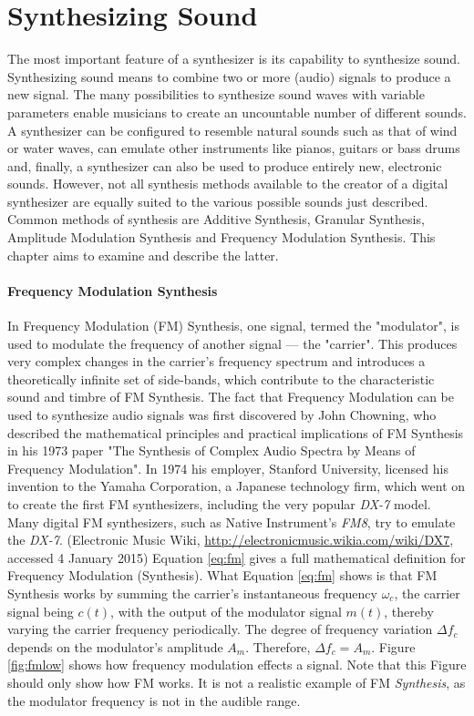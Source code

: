 \chapter{Synthesizing Sound}

The most important feature of a synthesizer is its capability to synthesize sound. Synthesizing sound means to combine two or more (audio) signals to produce a new signal. The many possibilities to synthesize sound waves with variable parameters enable musicians to create an uncountable number of different sounds. A synthesizer can be configured to resemble natural sounds such as that of wind or water waves, can emulate other instruments like pianos, guitars or bass drums and, finally, a synthesizer can also be used to produce entirely new, electronic sounds. However, not all synthesis methods available to the creator of a digital synthesizer are equally suited to the various possible sounds just described. Common methods of synthesis are Additive Synthesis, Granular Synthesis, Amplitude Modulation Synthesis and Frequency Modulation Synthesis. This chapter aims to examine and describe the latter.

\subsubsection{Frequency Modulation Synthesis}

In Frequency Modulation (FM) Synthesis, one signal, termed the "modulator", is used to modulate the frequency of another signal --- the "carrier". This produces very complex changes in the carrier's frequency spectrum and introduces a theoretically infinite set of side-bands, which contribute to the characteristic sound and timbre of FM Synthesis. The fact that Frequency Modulation can be used to synthesize audio signals was first discovered by John Chowning, who described the mathematical principles and practical implications of FM Synthesis in his 1973 paper "The Synthesis of Complex Audio Spectra by Means of Frequency Modulation". In 1974 his employer, Stanford University, licensed his invention to the Yamaha Corporation, a Japanese technology firm, which went on to create the first FM synthesizers, including the very popular \emph{DX-7} model. Many digital FM synthesizers, such as Native Instrument's \emph{FM8}, try to emulate the \emph{DX-7}. (Electronic Music Wiki, \url{http://electronicmusic.wikia.com/wiki/DX7}, accessed 4 January 2015) Equation \ref{eq:fm} gives a full mathematical definition for Frequency Modulation (Synthesis). What Equation \ref{eq:fm} shows is that FM Synthesis works by summing the carrier's instantaneous frequency $\omega_{c}$, the carrier signal being $c(t)$, with the output of the modulator signal $m(t)$, thereby varying the carrier frequency periodically. The degree of frequency variation $\Delta f_{c}$ depends on the modulator's amplitude $A_{m}$. Therefore, $\Delta f_{c} = A_{m}$. Figure \ref{fig:fmlow} shows how frequency modulation effects a signal. Note that this Figure should only show how FM works. It is not a realistic example of FM \emph{Synthesis}, as the modulator frequency is not in the audible range.


